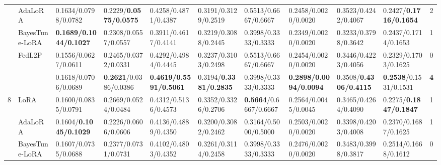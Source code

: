 \begin{table*}[t]
\begin{scriptsize}
{\begin{tabular}{c|l|l|l|l|l|l|l|l|l|c}
                    & AdaLoRA                              & 0.1634/0.0798/0.0782             & 0.2229/\textbf{0.0575/0.0575}             & 0.4258/0.4871/0.4387             & 0.3191/0.3129/0.2519             & 0.5513/0.6667/0.6667             & 0.2458/0.0020/0.0020               & 0.3523/0.4242/0.4067             & 0.2427/\textbf{0.1716/0.1654}             & 2             \\ %
                    & BayesTune-LoRA                            & \textbf{0.1689/0.1044/0.1027}    & 0.2308/0.0557/0.0557             & 0.3911/0.4617/0.4141             & 0.3219/0.3088/0.2445             & 0.3998/0.3333/0.3333             & 0.2349/0.0020/0.0020               & 0.3233/0.3798/0.3642             & 0.2437/0.1714/0.1653             & 1             \\ %
                    & FedL2P                               & 0.1556/0.0627/0.0611             & 0.2465/0.0372/0.0331             & 0.4292/0.4984/0.4445             & 0.3237/0.3103/0.2498             & 0.5513/0.6667/0.6667             & 0.2454/0.0020/0.0020               & 0.3446/0.4223/0.4056             & 0.2329/0.1703/0.1625             & 0             \\ %
                    & \method{}                                 & 0.1618/0.0706/0.0689             & \textbf{0.2621}/0.0386/0.0386    & \textbf{0.4619/0.5591/0.5061}    & 0.3194/\textbf{0.3381/0.2835}             & 0.3998/0.3333/0.3333             & \textbf{0.2898/0.0094/0.0094}    & 0.3508/\textbf{0.4306/0.4115}             & \textbf{0.2538}/0.1531/0.1531    & \textbf{4}    \\ \hline
\multirow{5}{*}{8}  & LoRA                                   & 0.1600/0.0835/0.0791               & 0.2669/0.0524/0.0484             & 0.4312/0.5136/0.4573             & 0.3352/0.3326/0.2706             & \textbf{0.5664}/0.6667/0.6667    & 0.2564/0.0045/0.0045             & 0.3465/0.4264/0.4090              & 0.2275/\textbf{0.1847/0.1847}             & 1             \\ %
                    & AdaLoRA                              & 0.1604/\textbf{0.1045/0.1029}             & 0.2226/0.0606/0.0606             & 0.4136/0.4889/0.4350              & 0.3200/0.3082/0.2462               & 0.3164/0.5000/0.5000                   & 0.2503/0.0020/0.0020               & 0.3398/0.4203/0.4008             & 0.2370/0.1687/0.1625              & 1             \\ %
                    & BayesTune-LoRA                            & 0.1607/0.0735/0.0688             & 0.2377/0.0731/0.0731             & 0.4102/0.4803/0.4352             & 0.3261/0.3114/0.2458             & 0.3998/0.3333/0.3333             & 0.2476/0.0020/0.0020               & 0.3483/0.3998/0.3817             & 0.2514/0.1668/0.1612             & 0             \\ %

\end{tabular}}
\end{scriptsize}
\end{table*}
